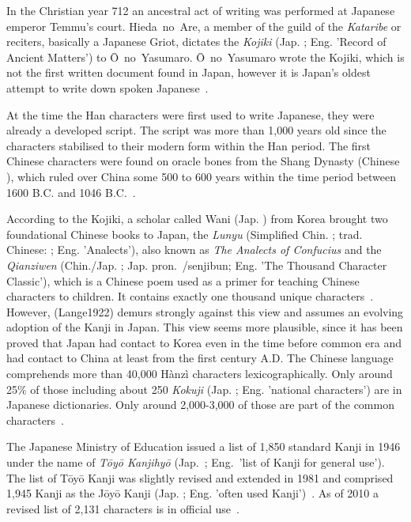In the Christian year 712 an ancestral act of writing was performed at 
Japanese emperor Temmu's court. Hieda~no~Are, a member of the guild of the 
\emph{Kataribe} or reciters, basically a Japanese Griot, dictates the 
\emph{Kojiki} (Jap. ; Eng. 'Record of Ancient Matters') to 
Ō~no~Yasumaro. Ō~no~Yasumaro wrote the Kojiki, which is not the first written 
document found in Japan, however it is Japan's oldest attempt to write down 
spoken Japanese~.

At the time the Han characters were first used to write Japanese, 
they were already a developed script. The script was more than 1,000 years old
since the characters stabilised to their modern form within the Han 
period. %
The first Chinese characters were found on oracle bones from the Shang Dynasty
(Chinese ), which ruled over China some 500 to 600 years within the 
time period between 1600 B.C. and 1046 B.C.~.

According to the Kojiki, a scholar called Wani (Jap. ) from Korea 
brought two foundational Chinese books to Japan, the \emph{Lunyu} 
(Simplified Chin. ; trad. Chinese: ; Eng. 'Analects'), 
also known as \emph{The Analects of Confucius} and 
the \emph{Qianziwen} (Chin./Jap. ; Jap. 
pron.~/senjibun; Eng. 'The Thousand Character Classic'),
which is a Chinese poem used as a primer for teaching Chinese characters to 
children. It contains exactly one thousand unique 
characters~. However, \shortcite(Lange1922) demurs 
strongly against this view and assumes an evolving adoption of the Kanji in
Japan. This view seems more plausible, since it has been proved that Japan 
had contact to Korea even in the time before common era and had contact to 
China at least from the first century A.D. The Chinese language comprehends more
than 40,000 Hànzì characters lexicographically. Only around 25\% of those 
including about 250 \emph{Kokuji} (Jap. ; Eng. 'national characters') 
are in Japanese dictionaries. Only around 2,000-3,000 of those are part of the 
common characters~. 

The Japanese Ministry of Education issued a list of 1,850 standard Kanji in 1946
under the name of \emph{Tōyō Kanjihyō} (Jap.~;
Eng.~'list of Kanji for general use'). The list of Tōyō Kanji was slightly 
revised and extended in 1981 and comprised 1,945 Kanji as the Jōyō Kanji
(Jap. ; Eng. 'often used Kanji')~.
As of 2010 a revised list of 2,131 characters is in official 
use~. 

